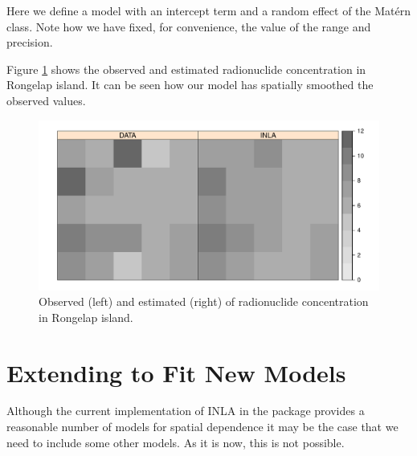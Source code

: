 \documentclass[article]{jss}
\begin{document}
Here we define a model with an intercept term and a random effect of the
Mat\'ern class. Note how we have fixed, for convenience, 
the value of the range and precision.

\begin{Schunk}
\end{Schunk}

Figure \ref{fig:geos} shows the observed and estimated radionuclide
concentration in Rongelap island. It can be seen how our model has spatially
smoothed the observed values.

\begin{figure}[h]
\begin{center}
\includegraphics{spatial_inla-012}
\caption{Observed (left) and estimated (right) of radionuclide concentration
in Rongelap island.}
\label{fig:geos}
\end{center}
\end{figure}



\section[Extending R-INLA to Fit New Models]{Extending  to Fit New
Models} 

\label{sec:extINLA}


Although the current implementation of INLA in the  package
provides a reasonable number of models for spatial dependence it may be the
case that we need to include some other models. As it is now, this is not
possible.
\end{document}
